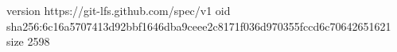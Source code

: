 version https://git-lfs.github.com/spec/v1
oid sha256:6c16a5707413d92bbf1646dba9ceee2c8171f036d970355fccd6c70642651621
size 2598
